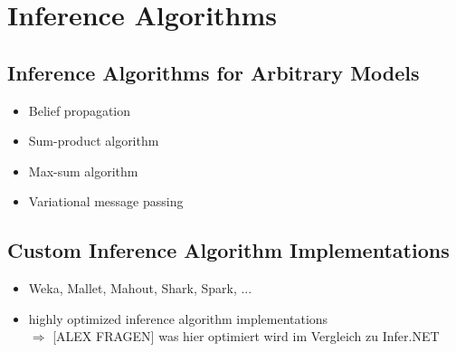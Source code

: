 \section{Inference Algorithms}

\subsection{Inference Algorithms for Arbitrary Models}

\begin{itemize}
\item Belief propagation
\item Sum-product algorithm
\item Max-sum algorithm
\item Variational message passing
\end{itemize}

\subsection{Custom Inference Algorithm Implementations}

\begin{itemize}
\item Weka, Mallet, Mahout, Shark, Spark, ...
\item highly optimized inference algorithm implementations\\
$\Rightarrow$ [ALEX FRAGEN] was hier optimiert wird im Vergleich zu Infer.NET
\end{itemize}
